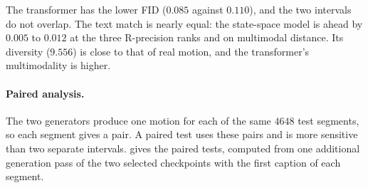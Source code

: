 \begin{table}[H]
\centering
\caption{Generation quality on the HumanML3D-263 test split ($4648$ segments, 20 repetitions, one sampling setting for both). FID is given with the half-width of its $95\%$ interval over the repetitions. Bold marks the better of the two generators where the difference is larger than that interval. Cited rows are from the respective papers and are given for context only.}
\label{tab:twin_results}
\end{table}

The transformer has the lower FID ($0.085$ against $0.110$), and the two intervals do not overlap. The text match is nearly equal: the state-space model is ahead by $0.005$ to $0.012$ at the three R-precision ranks and on multimodal distance. Its diversity ($9.556$) is close to that of real motion, and the transformer's multimodality is higher.

\paragraph{Paired analysis.} The two generators produce one motion for each of the same $4648$ test segments, so each segment gives a pair. A paired test uses these pairs and is more sensitive than two separate intervals.  gives the paired tests, computed from one additional generation pass of the two selected checkpoints with the first caption of each segment.

